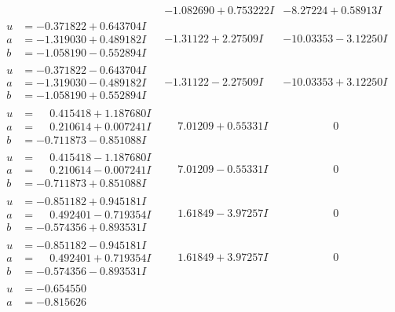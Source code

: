 \documentclass[1p]{elsarticle_modified}
\theoremstyle{definition}
\begin{document}
$$\begin{array}{c|c|c}
 & -1.082690 + 0.753222 I & -8.27224 + 0.58913 I \\ \hline\begin{aligned}
u &= -0.371822 + 0.643704 I \\
a &= -1.319030 + 0.489182 I \\
b &= -1.058190 - 0.552894 I\end{aligned}
 & -1.31122 + 2.27509 I & -10.03353 - 3.12250 I \\ \hline\begin{aligned}
u &= -0.371822 - 0.643704 I \\
a &= -1.319030 - 0.489182 I \\
b &= -1.058190 + 0.552894 I\end{aligned}
 & -1.31122 - 2.27509 I & -10.03353 + 3.12250 I \\ \hline\begin{aligned}
u &= \phantom{-}0.415418 + 1.187680 I \\
a &= \phantom{-}0.210614 + 0.007241 I \\
b &= -0.711873 - 0.851088 I\end{aligned}
 & \phantom{-}7.01209 + 0.55331 I & \phantom{-0.000000 } 0 \\ \hline\begin{aligned}
u &= \phantom{-}0.415418 - 1.187680 I \\
a &= \phantom{-}0.210614 - 0.007241 I \\
b &= -0.711873 + 0.851088 I\end{aligned}
 & \phantom{-}7.01209 - 0.55331 I & \phantom{-0.000000 } 0 \\ \hline\begin{aligned}
u &= -0.851182 + 0.945181 I \\
a &= \phantom{-}0.492401 - 0.719354 I \\
b &= -0.574356 + 0.893531 I\end{aligned}
 & \phantom{-}1.61849 - 3.97257 I & \phantom{-0.000000 } 0 \\ \hline\begin{aligned}
u &= -0.851182 - 0.945181 I \\
a &= \phantom{-}0.492401 + 0.719354 I \\
b &= -0.574356 - 0.893531 I\end{aligned}
 & \phantom{-}1.61849 + 3.97257 I & \phantom{-0.000000 } 0 \\ \hline\begin{aligned}
u &= -0.654550\phantom{ +0.000000I} \\
a &= -0.815626\phantom{ +0.000000I} \\

\end{aligned}
\end{array}$$
\end{document}
